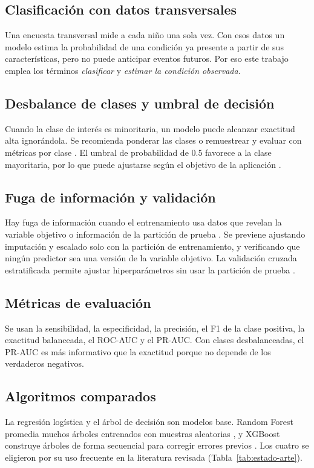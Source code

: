 \subsection{Clasificación con datos transversales}
Una encuesta transversal mide a cada niño una sola vez. Con esos datos un modelo estima la probabilidad de una condición ya presente a partir de sus características, pero no puede anticipar eventos futuros. Por eso este trabajo emplea los términos \emph{clasificar} y \emph{estimar la condición observada}.

\subsection{Desbalance de clases y umbral de decisión}
Cuando la clase de interés es minoritaria, un modelo puede alcanzar exactitud alta ignorándola. Se recomienda ponderar las clases o remuestrear y evaluar con métricas por clase \cite{he2009learning}. El umbral de probabilidad de \num{0.5} favorece a la clase mayoritaria, por lo que puede ajustarse según el objetivo de la aplicación \cite{provost2000machine}.

\subsection{Fuga de información y validación}
Hay fuga de información cuando el entrenamiento usa datos que revelan la variable objetivo o información de la partición de prueba \cite{kaufman2011leakage}. Se previene ajustando imputación y escalado solo con la partición de entrenamiento, y verificando que ningún predictor sea una versión de la variable objetivo. La validación cruzada estratificada permite ajustar hiperparámetros sin usar la partición de prueba \cite{refaeilzadeh2009cross}.

\subsection{Métricas de evaluación}
Se usan la sensibilidad, la especificidad, la precisión, el F1 de la clase positiva, la exactitud balanceada, el ROC-AUC \cite{fawcett2006introduction} y el PR-AUC. Con clases desbalanceadas, el PR-AUC es más informativo que la exactitud porque no depende de los verdaderos negativos.

\subsection{Algoritmos comparados}
La regresión logística y el árbol de decisión son modelos base. Random Forest promedia muchos árboles entrenados con muestras aleatorias \cite{breiman2001random}, y XGBoost construye árboles de forma secuencial para corregir errores previos \cite{chen2016xgboost}. Los cuatro se eligieron por su uso frecuente en la literatura revisada (Tabla~\ref{tab:estado-arte}).

